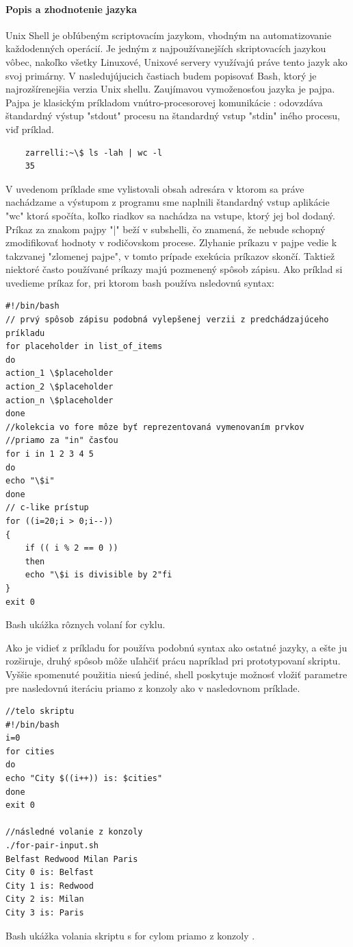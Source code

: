 \paragraph{Popis a zhodnotenie jazyka}
\indent
Unix Shell je obľúbeným scriptovacím jazykom, vhodným na automatizovanie každodenných operácií. Je jedným z najpoužívanejších skriptovacích jazykou vôbec, nakoľko všetky Linuxové, Unixové servery využívajú práve tento jazyk ako svoj primárny. V nasledujújucich častiach budem popisovať Bash, ktorý je najrozšírenejšia verzia Unix shellu. Zaujímavou vymoženosťou jazyka je pajpa. Pajpa je klasickým príkladom vnútro-procesorovej komunikácie : odovzdáva štandardný výstup "stdout" procesu na štandardný vstup "stdin" iného procesu, viď príklad.
\begin{verbatim}
	zarrelli:~\$ ls -lah | wc -l
	35
\end{verbatim}
V uvedenom príklade sme vylistovali obsah adresára v ktorom sa práve nachádzame a výstupom z programu sme naplnili štandardný vstup aplikácie "wc" ktorá spočíta, koľko riadkov sa nachádza na vstupe, ktorý jej bol dodaný. Príkaz za znakom pajpy "|" beží v subshelli, čo znamená, že nebude schopný zmodifikovať hodnoty v rodičovskom procese. Zlyhanie príkazu v pajpe vedie k takzvanej "zlomenej pajpe", v tomto prípade exekúcia príkazov skončí. \cite{mbash}
\newpage
Taktiež niektoré často používané príkazy majú pozmenený spôsob zápisu.
Ako príklad si uvedieme príkaz for, pri ktorom bash používa nsledovnú syntax:

\begin{algorithm}
	\begin{verbatim}
#!/bin/bash
// prvý spôsob zápisu podobná vylepšenej verzii z predchádzajúceho príkladu
for placeholder in list_of_items
do
action_1 \$placeholder
action_2 \$placeholder
action_n \$placeholder
done
//kolekcia vo fore môze byť reprezentovaná vymenovaním prvkov 
//priamo za "in" časťou
for i in 1 2 3 4 5
do
echo "\$i"
done
// c-like prístup
for ((i=20;i > 0;i--))
{
	if (( i % 2 == 0 ))
	then
	echo "\$i is divisible by 2"fi
}
exit 0
	\end{verbatim} 
	\caption{Bash ukážka rôznych volaní for cyklu. \cite{mbash}}
\label{alg:gen}
\end{algorithm}

Ako je vidieť z príkladu for používa podobnú syntax ako ostatné jazyky, a ešte ju rozširuje, druhý spôsob môže uľahčiť prácu napríklad pri prototypovaní skriptu. Vyššie spomenuté použitia niesú jediné, shell poskytuje možnosť vložiť parametre pre nasledovnú iteráciu priamo z konzoly ako v nasledovnom príklade.
\newpage
\begin{algorithm}
	\begin{verbatim}
//telo skriptu
#!/bin/bash
i=0
for cities 
do
echo "City $((i++)) is: $cities"
done
exit 0

//následné volanie z konzoly
./for-pair-input.sh 
Belfast Redwood Milan Paris
City 0 is: Belfast
City 1 is: Redwood
City 2 is: Milan
City 3 is: Paris
	\end{verbatim}
	\caption{Bash ukážka volania skriptu s for cylom priamo z konzoly . \cite{mbash}}
	\label{alg:gen}
\end{algorithm}

